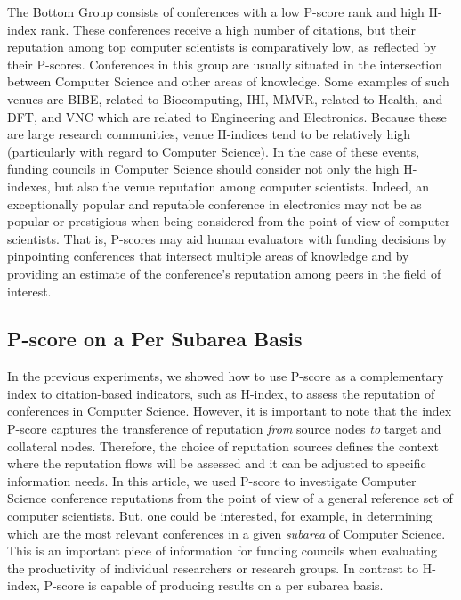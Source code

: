 \documentclass[notitlepage]{svjour3}
\begin{document}
The Bottom Group consists of conferences with a low P-score rank and high H-index rank. These conferences
receive a high number of citations, but their reputation among top computer scientists is comparatively low, 
as reflected by their P-scores. Conferences in this
group are usually situated in the intersection between Computer Science and other areas of knowledge. Some examples of such venues are
BIBE, related to Biocomputing, IHI, MMVR, related to Health, and
DFT, and VNC which are related to Engineering and Electronics. Because these are large research communities, venue H-indices tend to be 
relatively high (particularly with regard to Computer Science). In the case of these events, funding councils in Computer Science should consider not only the high H-indexes, but also the venue reputation among computer
scientists. Indeed, an exceptionally popular and reputable conference in electronics may not be as 
popular or prestigious when being considered from the point of view of computer scientists. That is, P-scores may aid 
human evaluators with funding decisions by pinpointing conferences that intersect multiple areas of knowledge and by providing
an estimate of the conference's reputation among peers in the field of interest.

\subsection{P-score on a Per Subarea Basis}

In the previous experiments, we showed how to use P-score as a complementary 
index to citation-based indicators, such as H-index, to assess the reputation 
of conferences in Computer Science. However, it is important to note that the 
index P-score captures the transference of reputation \textit{from} source nodes 
\textit{to} target and collateral nodes. Therefore, the choice of reputation 
sources defines the context where the reputation flows will be assessed and 
it can be adjusted to specific information needs. In this article, we used P-score 
to investigate Computer Science conference reputations from the point of view of
a general reference set of computer scientists. But,
one could be interested, for example, in determining which are the most relevant conferences 
in a given \textit{subarea} of Computer Science. This is an important piece of 
information for funding councils when evaluating the productivity of individual 
researchers or research groups. In contrast to H-index, P-score is capable 
of producing results on a per subarea basis. %
\end{document}
